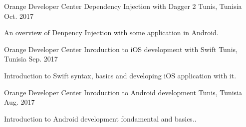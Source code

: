 

\begin{cventries}
	
	\cventry
		{Orange Developer Center} %
		{Dependency Injection with Dagger 2} %
		{Tunis, Tunisia} %
		{Oct. 2017} %
		{
			\begin{cvitems} %
				\item {An overview of Denpency Injection with some application in Android.}
			\end{cvitems}
		}

  \cventry
    {Orange Developer Center} %
    {Inroduction to iOS development with Swift} %
    {Tunis, Tunisia} %
    {Sep. 2017} %
    {
      \begin{cvitems} %
        \item {Introduction to Swift syntax, basics and developing iOS application with it.}
      \end{cvitems}
    }
	
	\cventry
		{Orange Developer Center} %
		{Inroduction to Android development} %
		{Tunis, Tunisia} %
		{Aug. 2017} %
		{
			\begin{cvitems} %
				\item {Introduction to Android development fondamental and basics..}
			\end{cvitems}
		}

\end{cventries}
